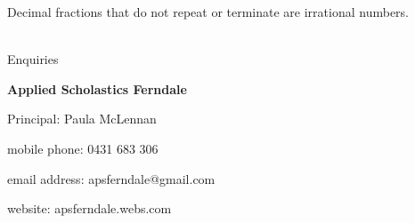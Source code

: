 \documentclass{article}
\begin{document}
Decimal fractions that do not repeat or terminate are irrational numbers.\\

\newpage
\
\newpage
\
\newpage
\

\begin{center}
\linespread{2}\large

Enquiries

\textbf{Applied Scholastics Ferndale}

Principal: Paula McLennan

mobile phone: 0431 683 306

email address: apsferndale@gmail.com

website: apsferndale.webs.com
\end{center}
\end{document}
